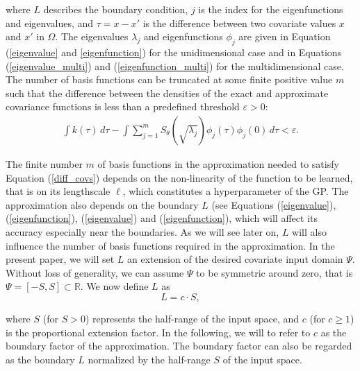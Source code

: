 \documentclass[]{interact}
\theoremstyle{plain}%
\theoremstyle{definition}
\theoremstyle{remark}
\begin{document}
\noindent where $L$ describes the boundary condition, $j$ is the index for the eigenfunctions and eigenvalues, and $\tau=x-x'$ is the difference between two covariate values $x$ and $x'$ in $\Omega$. The eigenvalues $\lambda_j$ and eigenfunctions $\phi_j$ are given in Equation (\ref{eigenvalue} and \ref{eigenfunction}) for the unidimensional case and in Equations (\ref{eigenvalue_multi}) and (\ref{eigenfunction_multi}) for the multidimensional case. The number of basis functions can be truncated at some finite positive value $m$ such that the difference between the densities of the exact and approximate covariance functions is less than a predefined threshold $\varepsilon > 0$:
%
\begin{eqnarray}\label{diff_covs}
\int k(\tau) \, d\tau - 
\int \sum_{j=1}^m S_{\theta}\left(\sqrt{\lambda_j} \right) \phi_j(\tau) \phi_j(0) \, d\tau < \varepsilon.
\end{eqnarray}

The finite number $m$ of basis functions in the approximation needed to satisfy Equation (\ref{diff_covs}) depends on the non-linearity of the function to be learned, that is on its lengthscale $\ell$, which constitutes a hyperparameter of the GP. The approximation also depends on the boundary $L$ (see Equations (\ref{eigenvalue}), (\ref{eigenfunction}), (\ref{eigenvalue}) and (\ref{eigenfunction}), which will affect its accuracy especially near the boundaries. As we will see later on, $L$ will also influence the number of basis functions required in the approximation. In the present paper, we will set $L$ an extension of the desired covariate input domain $\Psi$. Without loss of generality, we can assume $\Psi$ to be symmetric around zero, that is $\Psi=[-S,S] \subset \mathbb{R}$. We now define $L$ as
%
\begin{equation}\label{eq:boundary}
L=c \cdot S,
\end{equation} 

\noindent where $S$ (for $S > 0$) represents the half-range of the input space, and $c$ (for $c \geq 1$) is the proportional extension factor. In the following, we will to refer to $c$ as the boundary factor of the approximation. The boundary factor can also be regarded as the boundary $L$ normalized by the half-range $S$ of the input space.
\end{document}
